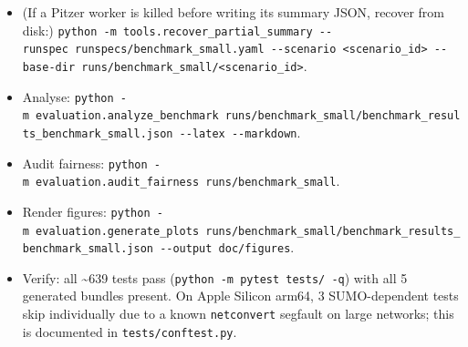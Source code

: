 \begin{itemize}
\item[$\square$]
  (If a Pitzer worker is killed before writing its summary JSON, recover
  from disk:)
  \texttt{python\ -m\ tools.recover\_partial\_summary\ -\/-runspec\ runspecs/benchmark\_small.yaml\ -\/-scenario\ \textless{}scenario\_id\textgreater{}\ -\/-base-dir\ runs/benchmark\_small/\textless{}scenario\_id\textgreater{}}.
\item[$\square$]
  Analyse:
  \texttt{python\ -m\ evaluation.analyze\_benchmark\ runs/benchmark\_small/benchmark\_results\_benchmark\_small.json\ -\/-latex\ -\/-markdown}.
\item[$\square$]
  Audit fairness:
  \texttt{python\ -m\ evaluation.audit\_fairness\ runs/benchmark\_small}.
\item[$\square$]
  Render figures:
  \texttt{python\ -m\ evaluation.generate\_plots\ runs/benchmark\_small/benchmark\_results\_benchmark\_small.json\ -\/-output\ doc/figures}.
\item[$\square$]
  Verify: all \textasciitilde639 tests pass
  (\texttt{python\ -m\ pytest\ tests/\ -q}) with all 5 generated bundles
  present. On Apple Silicon arm64, 3 SUMO-dependent tests skip
  individually due to a known \texttt{netconvert} segfault on large
  networks; this is documented in \texttt{tests/conftest.py}.
\end{itemize}
